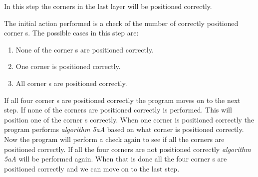 In this step the corners in the last layer will be positioned correctly.

The initial action performed is a check of the number of correctly positioned corner \cpiece{}s.
The possible cases in this step are:
\begin{enumerate}
	\item None of the corner \cubie{}s are positioned correctly.
	\item One corner \cubie{} is positioned correctly.
	\item All corner \cubie{}s are positioned correctly.
\end{enumerate}

If all four corner \cpiece{}s are positioned correctly the program moves on to the next step.
If none of the corners are positioned correctly  is performed. This will position one of the corner \cpiece{}s correctly.
When one corner is positioned correctly the program performs \textit{algorithm 5aA} based on what corner is positioned correctly.
Now the program will perform a check again to see if all the corners are positioned correctly. If all the four corners are not positioned correctly \textit{algorithm 5aA} will be performed again.
When that is done all the four corner \cpiece{}s are positioned correctly and we can move on to the last step.